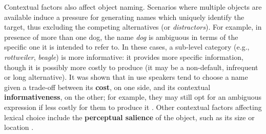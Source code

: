 Contextual factors also affect object naming. Scenarios where multiple objects are available induce a pressure for generating names which uniquely identify the target, thus excluding the competing alternatives (or \textit{distractors})\cite{olson1970language}. For example, in presence of more than one dog, the name \textit{dog} is ambiguous in terms of the specific one it is intended to refer to. In these cases, a sub-level category (e.g., \textit{rottweiler}, \textit{beagle}) is more informative: it provides more specific information, though it is possibly more costly to produce (it may be a non-default, infrequent or long alternative). It was shown that in use speakers tend to choose a name given a trade-off between its \textbf{cost}, on one side, and its contextual \textbf{informativeness}, on the other; for example, they may still opt for an ambiguous expression if less costly for them to produce it \cite{rohde2012communicating} \cite{graf2016animal}. 
Other contextual factors affecting lexical choice include the \textbf{perceptual salience} of the object, such as its size or location \cite{clark1983common}.



	
